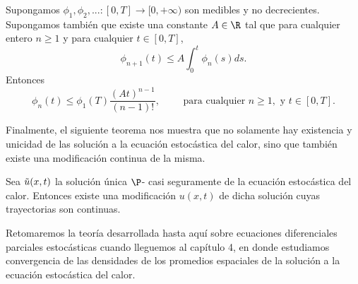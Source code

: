 \begin{teo} 
Supongamos $\phi_1,\phi_2,...:[0,T]\to[0,+\infty)$ son medibles y no decrecientes. Supongamos también que existe una constante $A\in \R$ tal que para cualquier entero $n\geq1$ y para cualquier $t\in[0,T]$,
\[
\phi_{n+1}(t)\leq A\int_{0}^{t}\phi_n(s)ds.   
\]
Entonces 
\[
\phi_n(t)\leq \phi_1(T)\frac{(At)^{n-1}}{(n-1)!}, \qquad \text{ para cualquier }n\geq1, \text{ y } t\in[0,T].   
\]
\end{teo}
Finalmente, el siguiente teorema nos muestra que no solamente hay existencia y unicidad de las solución a la ecuación estocástica del calor, sino que también existe una modificación continua de la misma.

\begin{teo} 
Sea $\Tilde{u}(x,t)$ la solución única $\P$- casi seguramente de la ecuación estocástica del calor. Entonces existe una modificación $u(x,t)$ de dicha solución cuyas trayectorias son continuas.
\end{teo}

Retomaremos la teoría desarrollada hasta aquí sobre ecuaciones diferenciales parciales estocásticas cuando lleguemos al capítulo 4, en donde estudiamos convergencia de las densidades de los promedios espaciales de la solución a la ecuación estocástica del calor. 